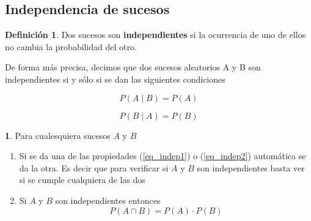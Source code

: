 \documentclass[]{book}
\theoremstyle{plain}
\theoremstyle{definition}
\newtheorem{definition}[theorem]{Definición}
\theoremstyle{definition} %
\newcommand{\thistheoremname}{}
\newtheorem{genericthm}[theorem]{\thistheoremname}
\newenvironment{customdef}[1]
  {\renewcommand{\thistheoremname}{#1}%
   \begin{genericthm}}
  {\end{genericthm}}
\begin{document}
\subsection{Independencia de sucesos}

\begin{definition}
  Dos sucesos son \textbf{independientes} si la ocurrencia de uno de ellos no cambia la probabilidad del otro.

  De forma más precisa, decimos que dos sucesos aleatorios A y B son independientes si y sólo si se dan las siguientes condiciones
   
\begin{equation}
  \label{eq_indep1} P(A \mid B) = P(A)
\end{equation}

\begin{equation}
  \label{eq_indep2} P(B\mid A) = P(B)
\end{equation}

\end{definition}

\begin{customdef}{Propiedades}
  Para cualesquiera sucesos $A$ y $B$
  \begin{enumerate}[(1)]
    \item Si se da una de las propiedades (\ref{eq_indep1}) o (\ref{eq_indep2}) automática se da la otra. 
    Es decir que para verificar si $A$ y $B$ son independientes basta ver si se cumple cualquiera de las dos
    \item Si $A$ y $B$ son independientes entonces 
    \[P(A\cap B) = P(A) \cdot P(B)\]
  \end{enumerate}
\end{customdef}
\end{document}
